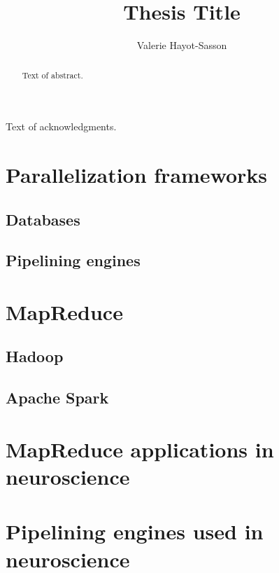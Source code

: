 
\author{Valerie Hayot-Sasson}
\title{Thesis Title}
\PhD                            %
\cosupervisor                   %




\begin{abstract}
  Text of abstract.  
\end{abstract}

\begin{acknowledgments}
  Text of acknowledgments.
\end{acknowledgments}

\chapter{Parallelization frameworks}
\section{Databases}
\section{Pipelining engines}
\chapter{MapReduce}
\cite{mapred}

\section{Hadoop}
\cite{hadoop}

\section{Apache Spark}
\cite{spark}
\chapter{MapReduce applications in neuroscience}
\cite{thunder}

\chapter{Pipelining engines used in neuroscience}
\cite{nipype}





